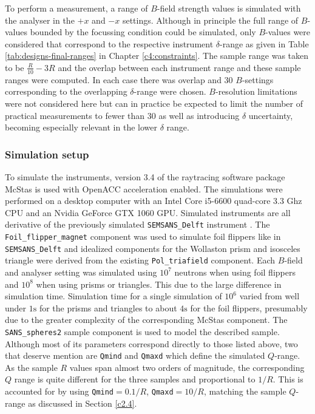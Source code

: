\documentclass{article}
\begin{document}
To perform a measurement, a range of $B$-field strength values is simulated with the analyser in the $+x$ and $-x$ settings. Although in principle the full range of $B$-values bounded by the focussing condition could be simulated, only $B$-values were considered that correspond to the respective instrument $\delta$-range as given in Table \ref{tab:designs-final-ranges} in Chapter \ref{c4:constraints}. The sample range was taken to be $\frac{R}{10} - 3R$ and the overlap between each instrument range and these sample ranges were computed. In each case there was overlap and 30 $B$-settings corresponding to the overlapping $\delta$-range were chosen. $B$-resolution limitations were not considered here but can in practice be expected to limit the number of practical measurements to fewer than 30 as well as introducing $\delta$ uncertainty, becoming especially relevant in the lower $\delta$ range. 

\subsubsection{Simulation setup}
To simulate the instruments, version 3.4 of the raytracing software package McStas \cite{willendrup2020} is used with OpenACC acceleration enabled. The simulations were performed on a desktop computer with an Intel Core i5-6600 quad-core 3.3 Ghz CPU and an Nvidia GeForce GTX 1060 GPU. Simulated instruments are all derivative of the previously simulated \texttt{SEMSANS\_Delft} instrument \cite{bouwman2021b}. The \texttt{Foil\_flipper\_magnet} component was used to simulate foil flippers like in \texttt{SEMSANS\_Delft} and idealized components for the Wollaston prism and isosceles triangle were derived from the existing \texttt{Pol\_triafield} component. Each $B$-field and analyser setting was simulated using $10^7$ neutrons when using foil flippers and $10^8$ when using prisms or triangles. This due to the large difference in simulation time. Simulation time for a single simulation of $10^6$ varied from well under $1\unit{\second}$ for the prisms and triangles to about $4\unit{\second}$ for the foil flippers, presumably due to the greater complexity of the corresponding McStas component. 
The \texttt{SANS\_spheres2} sample component is used to model the described sample. Although most of its parameters correspond directly to those listed above, two that deserve mention are \texttt{Qmind} and \texttt{Qmaxd} which define the simulated $Q$-range. As the sample $R$ values span almost two orders of magnitude, the corresponding $Q$ range is quite different for the three samples and proportional to $1/R$. This is accounted for by using \texttt{Qmind}$=0.1/R$, \texttt{Qmaxd}$=10/R$, matching the sample $Q$-range as discussed in Section \ref{c2.4}.
\end{document}
